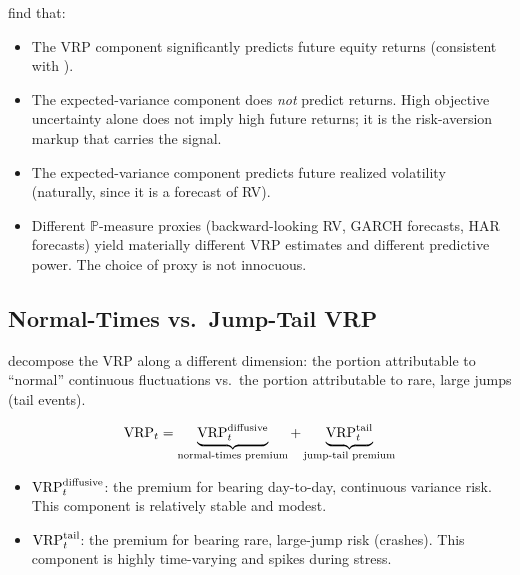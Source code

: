 \begin{keyresult}
\citet{BekaertHoerova2014} find that:
\begin{itemize}[nosep]
  \item The VRP component significantly predicts future equity returns (consistent with \citealt{BTZ2009}).
  \item The expected-variance component does \emph{not} predict returns. High objective uncertainty alone does not imply high future returns; it is the risk-aversion markup that carries the signal.
  \item The expected-variance component predicts future realized volatility (naturally, since it is a forecast of RV).
  \item Different $\mathbb{P}$-measure proxies (backward-looking RV, GARCH forecasts, HAR forecasts) yield materially different VRP estimates and different predictive power. The choice of proxy is not innocuous.
\end{itemize}
\end{keyresult}

\subsection{Normal-Times vs.\ Jump-Tail VRP}

\citet{BollerslevTodorov2015} decompose the VRP along a different dimension: the portion attributable to ``normal'' continuous fluctuations vs.\ the portion attributable to rare, large jumps (tail events).

\begin{definition}
\begin{equation}
  \operatorname{VRP}_t = \underbrace{\operatorname{VRP}^{\text{diffusive}}_t}_{\text{normal-times premium}} + \underbrace{\operatorname{VRP}^{\text{tail}}_t}_{\text{jump-tail premium}}
  \label{eq:bt-decomposition}
\end{equation}
\begin{itemize}[nosep]
  \item $\operatorname{VRP}^{\text{diffusive}}_t$: the premium for bearing day-to-day, continuous variance risk. This component is relatively stable and modest.
  \item $\operatorname{VRP}^{\text{tail}}_t$: the premium for bearing rare, large-jump risk (crashes). This component is highly time-varying and spikes during stress.
\end{itemize}
\end{definition}


